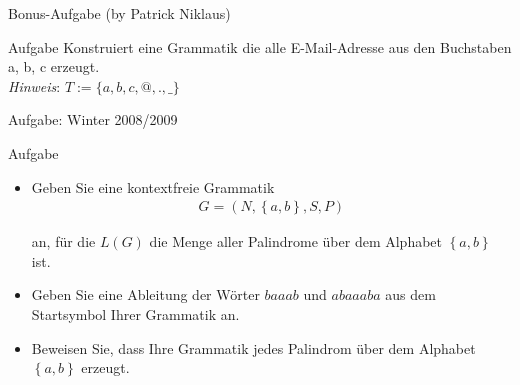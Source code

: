 	\begin{frame}{Bonus-Aufgabe (by Patrick Niklaus)}
  		\begin{exampleblock}{Aufgabe}
    		Konstruiert eine Grammatik die alle E-Mail-Adresse 
    		aus den Buchstaben {a, b, c} erzeugt.\\
    		
    		\emph{Hinweis}: $T := \{a, b, c, @, ., \_\}$
    		
  		\end{exampleblock}\pause
  			
	\end{frame}



	\begin{frame}{Aufgabe: Winter 2008/2009}
    	\begin{exampleblock}{Aufgabe}
        	\begin{itemize}
            	\item Geben Sie eine kontextfreie Grammatik 
                	\begin{align*}
                    	G = \left( N,\left\{ a,b\right\} ,S,P\right) 
                	\end{align*}
                	
                	an, für die $L\left( G\right) $ 
                	die Menge aller Palindrome über dem Alphabet 
                	$\left\{ a,b\right\} $ ist. 
                	
            	\item Geben Sie eine Ableitung der Wörter 
            	$baaab$ und $abaaaba$ aus dem Startsymbol Ihrer Grammatik an. 
            
            	\item Beweisen Sie, dass Ihre Grammatik jedes Palindrom 
            	über dem Alphabet $\left\{ a, b\right\} $ erzeugt.
        	\end{itemize}
    	\end{exampleblock}
	\end{frame}
	
